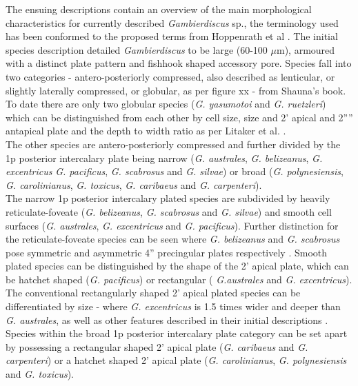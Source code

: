 \documentclass[12pt]{article}
\begin{document}
The ensuing descriptions contain an overview of the main morphological characteristics for currently described \emph{Gambierdiscus} sp., the terminology used has been conformed to the proposed terms from Hoppenrath et al \cite{hoppenrath2013taxonomy}. The initial species description detailed \emph{Gambierdiscus} to be large (60-100 $\mu$m), armoured with a distinct plate pattern and fishhook shaped accessory pore. Species fall into two categories - antero-posteriorly compressed, also described as lenticular, or slightly laterally compressed, or globular, as per figure xx - from Shauna's book. %
To date there are only two globular species (\emph{G. yasumotoi} and \emph{G. ruetzleri}) which can be distinguished from each other by cell size, size and 2' apical and 2'''' antapical plate and the depth to width ratio as per Litaker et al. \cite{litaker2009taxonomy}. \\
The other species are antero-posteriorly compressed and further divided by the 1p posterior intercalary plate being narrow (\emph{G. australes}, \emph{G. belizeanus}, \emph{G. excentricus} \emph{G. pacificus}, \emph{G. scabrosus} and \emph{G. silvae}) or broad (\emph{G. polynesiensis}, \emph{G. carolinianus}, \emph{G. toxicus}, \emph{G. caribaeus} and \emph{G. carpenteri}). \\
The narrow 1p posterior intercalary plated species are subdivided by heavily reticulate-foveate (\emph{G. belizeanus}, \emph{G. scabrosus} and \emph{G. silvae}) and smooth cell surfaces (\emph{G. australes}, \emph{G. excentricus} and \emph{G. pacificus}). Further distinction for the reticulate-foveate species can be seen where \emph{G. belizeanus} and \emph{G. scabrosus} pose symmetric and asymmetric 4'' precingular plates respectively \cite{nishimura2014morphology}. %
Smooth plated species can be distinguished by the shape of the 2' apical plate, which can be hatchet shaped (\emph{G. pacificus}) or rectangular ( \emph{G.australes} and \emph{G. excentricus}). The conventional rectangularly shaped 2' apical plated species can be differentiated by size - where \emph{G. excentricus} is 1.5 times wider and deeper than \emph{G. australes}, as well as other features described in their initial descriptions \cite{chinain1999morphology,fraga2011gambierdiscus}. \\
Species within the broad 1p posterior intercalary plate category can be set apart by possessing a rectangular shaped 2' apical plate (\emph{G. caribaeus} and \emph{G. carpenteri}) or a hatchet shaped 2' apical plate (\emph{G. carolinianus}, \emph{G. polynesiensis} and \emph{G. toxicus}).
\end{document}
